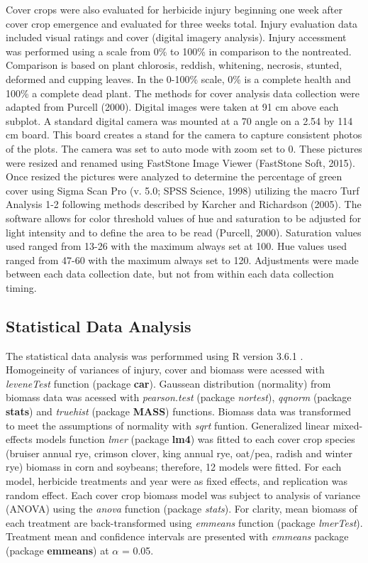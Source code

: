 \documentclass[agriculture,article,submit,moreauthors,pdftex]{mdpi}
\begin{document}
Cover crops were also evaluated for herbicide injury beginning one week
after cover crop emergence and evaluated for three weeks total. Injury
evaluation data included visual ratings and cover (digital imagery
analysis). Injury accessment was performed using a scale from 0\% to
100\% in comparison to the nontreated. Comparison is based on plant
chlorosis, reddish, whitening, necrosis, stunted, deformed and cupping
leaves. In the 0-100\% scale, 0\% is a complete health and 100\% a
complete dead plant. The methods for cover analysis data collection were
adapted from Purcell (2000). Digital images were taken at 91 cm above
each subplot. A standard digital camera was mounted at a 70 angle on a
2.54 by 114 cm board. This board creates a stand for the camera to
capture consistent photos of the plots. The camera was set to auto mode
with zoom set to 0. These pictures were resized and renamed using
FastStone Image Viewer (FastStone Soft, 2015). Once resized the pictures
were analyzed to determine the percentage of green cover using Sigma
Scan Pro (v. 5.0; SPSS Science, 1998) utilizing the macro Turf Analysis
1-2 following methods described by Karcher and Richardson (2005). The
software allows for color threshold values of hue and saturation to be
adjusted for light intensity and to define the area to be read (Purcell,
2000). Saturation values used ranged from 13-26 with the maximum always
set at 100. Hue values used ranged from 47-60 with the maximum always
set to 120. Adjustments were made between each data collection date, but
not from within each data collection timing.

\hypertarget{statistical-data-analysis}{%
\subsection{Statistical Data Analysis}\label{statistical-data-analysis}}

The statistical data analysis was performmed using R version 3.6.1
\citep{r_r:_2019}. Homogeineity of variances of injury, cover and
biomass were acessed with \emph{leveneTest} function (package
\textbf{car}). Gaussean distribution (normality) from biomass data was
acessed with \emph{pearson.test} (package \emph{nortest}), \emph{qqnorm}
(package \textbf{stats}) and \emph{truehist} (package \textbf{MASS})
functions. Biomass data was transformed to meet the assumptions of
normality with \emph{sqrt} funtion. Generalized linear mixed-effects
models function \emph{lmer} (package \textbf{lm4}) was fitted to each
cover crop species (bruiser annual rye, crimson clover, king annual rye,
oat/pea, radish and winter rye) biomass in corn and soybeans; therefore,
12 models were fitted. For each model, herbicide treatments and year
were as fixed effects, and replication was random effect. Each cover
crop biomass model was subject to analysis of variance (ANOVA) using the
\emph{anova} function (package \emph{stats}). For clarity, mean biomass
of each treatment are back-transformed using \emph{emmeans} function
(package \emph{lmerTest}). Treatment mean and confidence intervals are
presented with \emph{emmeans} package (package \textbf{emmeans}) at
\(\alpha\) = 0.05.
\end{document}
